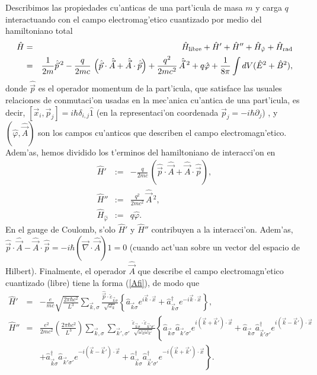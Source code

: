 Describimos las propiedades cu'anticas de una part'icula de masa $m$ y carga $q$
interactuando con el campo electromag'etico cuantizado por medio del
hamiltoniano total
\begin{eqnarray}
\hat{H}&=& \hat{H}_{\rm libre}+\hat{H}'+\hat{H}''+\hat{H}_{\hat{\varphi}}
+\hat{H}_{\rm rad} \label{hatH}\\
&=&\frac{1}{2m} \hat{\vec{p}}\,^2-\frac{q}{2mc}\,\left(
\hat{\vec{p}}\cdot\hat{\vec{A}}+\hat{\vec{A}}\cdot\hat{\vec{p}}\right)
+\frac{q^2}{2mc^2}\,\hat{\vec{A}}{\,}^2+q\hat{\varphi}+ \frac{1}{8\pi}\int dV
(\hat{E}^2+\hat{B}^2) ,
\end{eqnarray} 
donde $\hat{\vec{p}}$ es el operador momentum de la part'icula, que satisface
las usuales relaciones de conmutaci'on usadas en la mec'anica cu'antica de una
part'icula, es decir, $\left[ \vec{x}_i,\vec{p}_j\right]
=i\hbar\delta_{i,j}\hat{1}$ (en la
representaci'on coordenada $\vec{p}_j=-i\hbar \partial_j$)	, y
$(\hat{\varphi},\hat{\vec{A}})$ son los campos cu'anticos que describen el campo
electromagn'etico. Adem'as, hemos dividido los t'erminos del hamiltoniano de
interacci'on en
\begin{eqnarray}
\hat{H}'&:=&-\frac{q}{2mc}\,\left(
\hat{\vec{p}}\cdot\hat{\vec{A}}+\hat{\vec{A}}\cdot\hat{\vec{p}}\right),\\
\hat{H}''&:=&\frac{q^2}{2mc^2}\,\hat{\vec{A}}{\,}^2, \\
\hat{H}_{\hat{\varphi}}&:=&q\hat{\varphi} .
\end{eqnarray} 
En el gauge de Coulomb, s'olo $\hat{H}'$ y $\hat{H}''$ contribuyen a la
interacci'on. Adem'as,
$\hat{\vec{p}}\cdot\hat{\vec{A}}-\hat{\vec{A}}\cdot\hat{\vec{p}}=-i\hbar(\vec{
\nabla}\cdot \hat{\vec{A}}) \hat{1}=0$ (cuando act'uan sobre un vector del
espacio de Hilbert). Finalmente, el operador $\hat{\vec{A}}$ que describe el
campo electromagn'etico cuantizado (libre) tiene la forma (\ref{Afi}), de modo
que
\begin{eqnarray}
\hat{H}'&=&-\frac{e}{mc}\sqrt{\frac{2\pi\hbar
c^2}{L^3}}\sum_{\vec{k},\sigma}\frac{\hat{\vec{p}}\cdot\check{\varepsilon
}_{\vec{k}\sigma}}{\sqrt{\omega_k}}\left\{ \hat{a}_{\vec{k}\sigma}%
e^{i\vec{k}\cdot\vec{x}}+\hat{a}_{\vec{k}\sigma}^\dagger e^{-i\vec{k}%
\cdot\vec{x}}\right\} \label{H1},\\
\hat{H}''&=&\frac{e^2}{2mc^2}\left( \frac{2\pi\hbar
c^2}{L^3}\right)
\sum_{\vec{k},\sigma}\sum_{\vec{k}',\sigma'}\frac{\check{\varepsilon}_{\vec{k}
\sigma}\cdot\check{\varepsilon}_{\vec{k}'\sigma
'}}{\sqrt{\omega_k\omega_{k'}}}\left\{\hat{a}_{\vec{k}\sigma}\hat{a}_{\vec{k}
'\sigma '}e^{i\left( \vec{k}+\vec{k}'\right)
\cdot\vec{x}}+\hat{a}_{\vec{k}\sigma}\hat{a}_{\vec{k}'\sigma
'}^\dagger e^{i\left( \vec{k}-\vec{k}'\right) \cdot\vec{x}}\right. \nonumber \\
&&\left.+\hat{a}_{\vec{k}\sigma}^\dagger \hat{a}_{\vec{k}'\sigma '}e^{-i\left(
\vec{k}-\vec{k}'\right)
\cdot\vec{x}}+\hat{a}_{\vec{k}\sigma}^\dagger \hat{a}_{\vec{k}'\sigma
'}^\dagger e^{-i\left( \vec{k}+\vec{k}'\right) \cdot\vec{x}}\right\}
.\label{H2}
\end{eqnarray} 

